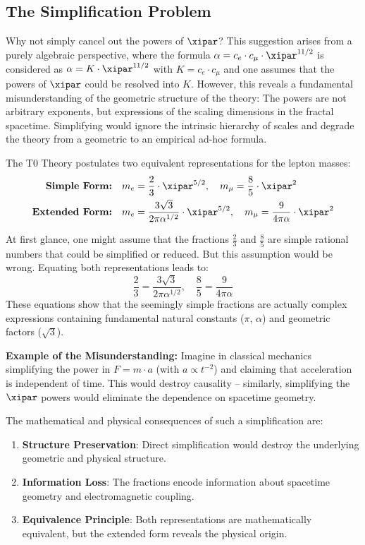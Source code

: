 	\subsection{The Simplification Problem}
	Why not simply cancel out the powers of $\xipar$? This suggestion arises from a purely algebraic perspective, where the formula $\alpha = c_e \cdot c_\mu \cdot \xipar^{11/2}$ is considered as $\alpha = K \cdot \xipar^{11/2}$ with $K = c_e \cdot c_\mu$ and one assumes that the powers of $\xipar$ could be resolved into $K$. However, this reveals a fundamental misunderstanding of the geometric structure of the theory: The powers are not arbitrary exponents, but expressions of the scaling dimensions in the fractal spacetime. Simplifying would ignore the intrinsic hierarchy of scales and degrade the theory from a geometric to an empirical ad-hoc formula.
	
	The T0 Theory postulates two equivalent representations for the lepton masses:
	\begin{align*}
		\textbf{Simple Form:} &\quad m_e = \frac{2}{3} \cdot \xipar^{5/2}, \quad m_\mu = \frac{8}{5} \cdot \xipar^2 \\
		\textbf{Extended Form:} &\quad m_e = \frac{3\sqrt{3}}{2\pi\alpha^{1/2}} \cdot \xipar^{5/2}, \quad m_\mu = \frac{9}{4\pi\alpha} \cdot \xipar^2
	\end{align*}
	
	At first glance, one might assume that the fractions $\frac{2}{3}$ and $\frac{8}{5}$ are simple rational numbers that could be simplified or reduced. But this assumption would be wrong. Equating both representations leads to:
	\[
	\frac{2}{3} = \frac{3\sqrt{3}}{2\pi\alpha^{1/2}}, \quad \frac{8}{5} = \frac{9}{4\pi\alpha}
	\]
	These equations show that the seemingly simple fractions are actually complex expressions containing fundamental natural constants ($\pi$, $\alpha$) and geometric factors ($\sqrt{3}$).
	
	\textbf{Example of the Misunderstanding:} Imagine in classical mechanics simplifying the power in $F = m \cdot a$ (with $a \propto t^{-2}$) and claiming that acceleration is independent of time. This would destroy causality – similarly, simplifying the $\xipar$ powers would eliminate the dependence on spacetime geometry.
	
	The mathematical and physical consequences of such a simplification are:
	\begin{enumerate}
		\item \textbf{Structure Preservation}: Direct simplification would destroy the underlying geometric and physical structure.
		\item \textbf{Information Loss}: The fractions encode information about spacetime geometry and electromagnetic coupling.
		\item \textbf{Equivalence Principle}: Both representations are mathematically equivalent, but the extended form reveals the physical origin.
	\end{enumerate}
	
